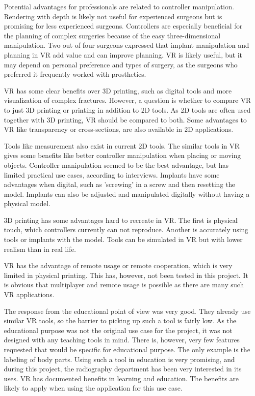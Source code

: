 \documentclass[a4paper]{report}
\begin{document}
Potential advantages for professionals are related to controller manipulation. Rendering with depth is likely not useful for experienced surgeons but is promising for less experienced surgeons.
Controllers are especially beneficial for the planning of complex surgeries because of the easy three-dimensional manipulation.
Two out of four surgeons expressed that implant manipulation and planning in VR add value and can improve planning. VR is likely useful, but it may depend on personal preference and types of surgery, as the surgeons who preferred it frequently worked with prosthetics.



VR has some clear benefits over 3D printing, such as digital tools and more visualization of complex fractures.
However, a question is whether to compare VR to just 3D printing or printing in addition to 2D tools. As 2D tools are often used together with 3D printing, VR should be compared to both. Some advantages to VR like transparency or cross-sections, are also available in 2D applications.

Tools like measurement also exist in current 2D tools. The similar tools in VR gives some benefits like better controller manipulation when placing or moving objects.
Controller manipulation seemed to be the best advantage, but has limited practical use cases, according to interviews.
Implants have some advantages when digital, such as 'screwing' in a screw and then resetting the model. Implants can also be adjusted and manipulated digitally without having a physical model.

3D printing has some advantages hard to recreate in VR. The first is physical touch, which controllers currently can not reproduce. Another is accurately using tools or implants with the model. Tools can be simulated in VR but with lower realism than in real life.

VR has the advantage of remote usage or remote cooperation, which is very limited in physical printing. This has, however, not been tested in this project. It is obvious that multiplayer and remote usage is possible as there are many such VR applications.




The response from the educational point of view was very good. They already use similar VR tools, so the barrier to picking up such a tool is fairly low.
As the educational purpose was not the original use case for the project, it was not designed with any teaching tools in mind. There is, however, very few features requested that would be specific for educational purpose. The only example is the labeling of body parts. 
Using such a tool in education is very promising, and during this project, the radiography department has been very interested in its uses.
VR has documented benefits in learning and education. The benefits are likely to apply when using the application for this use case.
\end{document}
